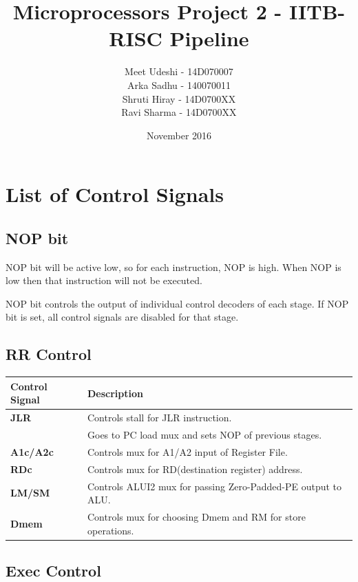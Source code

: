 \documentclass{article}
\title{Microprocessors Project 2 - IITB-RISC Pipeline}
\author{Meet Udeshi - 14D070007\\
Arka Sadhu - 140070011\\
Shruti Hiray - 14D0700XX\\
Ravi Sharma - 14D0700XX
}
\date{November 2016}
\begin{document}
\maketitle
 
\section*{List of Control Signals}

\subsection*{NOP bit}

NOP bit will be active low, so for each instruction, NOP is high. When NOP is
low then that instruction will not be executed.

NOP bit controls the output of individual control decoders of each stage.
If NOP bit is set, all control signals are disabled for that stage.

\subsection*{RR Control}

\begin{tabular}{|l|l|}
\hline
\textbf{Control Signal} & \textbf{Description}\\
\hline
\textbf{JLR} & Controls stall for JLR instruction. \\
             & Goes to PC load mux and sets NOP of previous stages.\\
\hline
\textbf{A1c/A2c} & Controls mux for A1/A2 input of Register File.\\
\hline
\textbf{RDc} & Controls mux for RD(destination register) address.\\
\hline
\textbf{LM/SM} & Controls ALUI2 mux for passing Zero-Padded-PE output to ALU.\\
\hline
\textbf{Dmem} & Controls mux for choosing Dmem and RM for store operations.\\
\hline
\end{tabular}

\subsection*{Exec Control}
\end{document}
